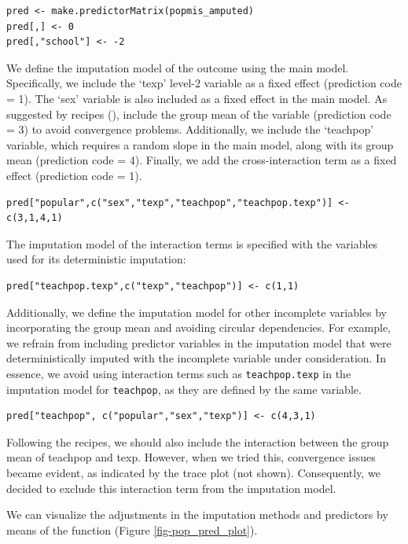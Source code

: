 \documentclass[
  article]{jss}
\begin{document}
\begin{verbatim}
pred <- make.predictorMatrix(popmis_amputed)
pred[,] <- 0
pred[,"school"] <- -2
\end{verbatim}

We define the imputation model of the outcome using the main model.
Specifically, we include the `texp' level-2 variable as a fixed effect
(prediction code = 1). The `sex' variable is also included as a fixed
effect in the main model. As suggested by recipes (\citep{buur18}),
include the group mean of the variable (prediction code = 3) to avoid
convergence problems. Additionally, we include the `teachpop' variable,
which requires a random slope in the main model, along with its group
mean (prediction code = 4). Finally, we add the cross-interaction term
as a fixed effect (prediction code = 1).

\begin{verbatim}
pred["popular",c("sex","texp","teachpop","teachpop.texp")] <- c(3,1,4,1)
\end{verbatim}

The imputation model of the interaction terms is specified with the
variables used for its deterministic imputation:

\begin{verbatim}
pred["teachpop.texp",c("texp","teachpop")] <- c(1,1)
\end{verbatim}

Additionally, we define the imputation model for other incomplete
variables by incorporating the group mean and avoiding circular
dependencies. For example, we refrain from including predictor variables
in the imputation model that were deterministically imputed with the
incomplete variable under consideration. In essence, we avoid using
interaction terms such as \texttt{teachpop.texp} in the imputation model
for \texttt{teachpop}, as they are defined by the same variable.

\begin{verbatim}
pred["teachpop", c("popular","sex","texp")] <- c(4,3,1)
\end{verbatim}

Following the recipes, we should also include the interaction between
the group mean of teachpop and texp. However, when we tried this,
convergence issues became evident, as indicated by the trace plot (not
shown). Consequently, we decided to exclude this interaction term from
the imputation model.

We can visualize the adjustments in the imputation methods and
predictors by means of the   function
(Figure \ref{fig-pop_pred_plot}).
\end{document}
